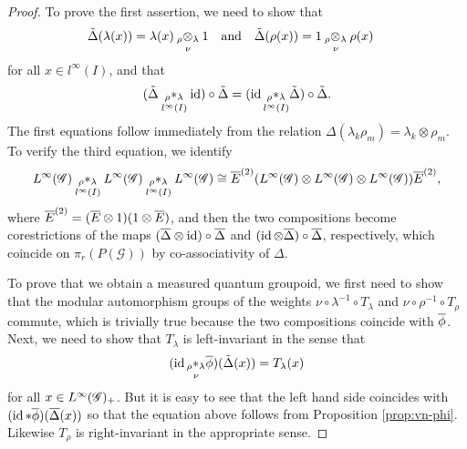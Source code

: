 \begin{proof}
  To prove the first assertion, we need to show that
  \begin{align*}
  \tilde\Delta(\lambda(x)) &= \lambda(x) \underset{\nu{}}{_{\rho}\otimes_{\lambda}} 1 &&\text{and} &
  \tilde\Delta(\rho(x)) &= 1 \underset{\nu{}}{_{\rho}\otimes_{\lambda}} \rho(x)
\end{align*}
 for all $x\in l^{\infty}(I)$,
and that
\begin{align*}
  (\tilde\Delta \underset{l^{\infty}(I)}{_{\rho}\ast_{\lambda}} \operatorname{id})\circ \tilde\Delta = (\operatorname{id} \underset{l^{\infty}(I)}{_{\rho}\ast_{\lambda}}
    \tilde\Delta) \circ \tilde\Delta.
\end{align*}
The first equations follow immediately from the relation
$\Delta(\lambda_{k}\rho_{m})=\lambda_{k} \otimes \rho_{m}$. To verify
the third equation, we identify
\begin{align*}
 L^{\infty}(\mathscr{G}) \underset{l^{\infty}(I)}{_{\rho}\ast_{\lambda}} L^{\infty}(\mathscr{G}) \underset{l^{\infty}(I)}{_{\rho}\ast_{\lambda}} L^{\infty}(\mathscr{G}) \cong \overline{E}^{(2)}(L^{\infty}(\mathscr{G})
  \otimes L^{\infty}(\mathscr{G}) \otimes L^{\infty}(\mathscr{G}))\overline{E}^{(2)},
\end{align*}
where $\overline{E}^{(2)}=(\overline{E} \otimes 1)(1 \otimes \overline{E})$, and then the two
compositions  become corestrictions of the maps $(\overline{\Delta} \otimes
\operatorname{id})\circ \overline{\Delta}$ and $(\operatorname{id} \otimes \overline{\Delta})\circ \overline{\Delta}$,
respectively, which coincide on $\pi_{r}(P(\mathscr{G}))$ by
co-associativity of $\Delta$. 

To prove that we obtain a measured quantum groupoid, we first need to
show that the modular automorphism groups of the weights $\nu \circ
\lambda^{-1} \circ T_{\lambda}$ and $\nu \circ \rho^{-1} \circ
T_{\rho}$ commute, which is trivially true because the two
compositions coincide with $\overline{\phi}$. Next, we need to show that
$T_{\lambda}$ is left-invariant in the sense that
  \begin{align*}
   (\operatorname{id} \underset{\nu}{_{\rho}\ast_{\lambda}} \overline{\phi})(\tilde\Delta(x)) = T_{\lambda}(x) 
  \end{align*}
  for all $x\in L^{\infty}(\mathscr{G})_{+}$. But it is easy to see that the left hand
  side coincides with $(\operatorname{id} \ast \overline{\phi})(\overline{\Delta}(x))$ so that the
  equation above follows from Proposition
  \ref{prop:vn-phi}. Likewise $T_{\rho}$ is right-invariant in
  the appropriate sense. 
\end{proof}

